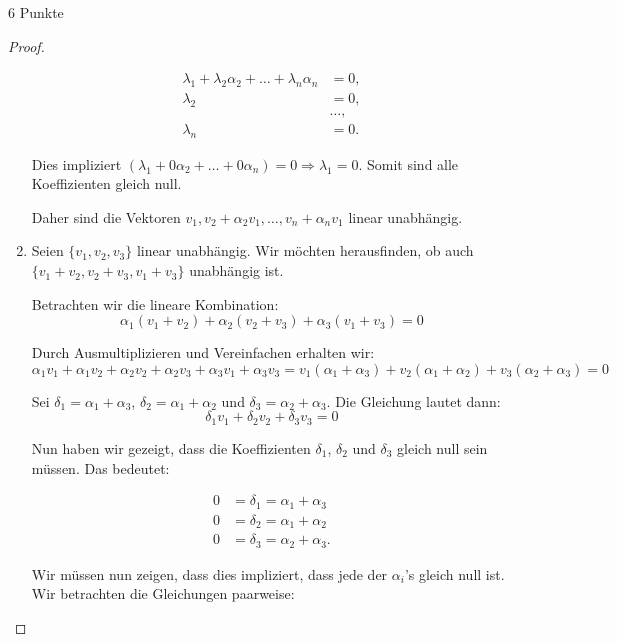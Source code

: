 \documentclass{../problemset}
\begin{document}
\begin{problem}{6 Punkte}
\begin{proof}
\begin{enumerate}
		      \begin{align*}
			      \lambda_1 + \lambda_2\alpha_2 + \ldots + \lambda_n\alpha_n & = 0,    \\
			      \lambda_2                                                  & = 0,    \\
			                                                                 & \ldots, \\
			      \lambda_n                                                  & = 0.
		      \end{align*}

		      Dies impliziert $(\lambda_1 + 0\alpha_2 + \ldots + 0\alpha_n) = 0 \Rightarrow \lambda_1 = 0$.
		      Somit sind alle Koeffizienten gleich null.

		      Daher sind die Vektoren $v_1, v_2 + \alpha_2v_1, \ldots, v_n + \alpha_nv_1$ linear unabhängig.

		\item Seien \(\{v_1, v_2, v_3\}\) linear unabhängig. Wir möchten herausfinden, ob auch \(\{v_1+v_2, v_2+v_3, v_1+v_3\}\) unabhängig ist.

		      Betrachten wir die lineare Kombination:
		      \[
			      \alpha_1(v_1+v_2) + \alpha_2(v_2+v_3) + \alpha_3(v_1+v_3) = 0
		      \]

		      Durch Ausmultiplizieren und Vereinfachen erhalten wir:
		      \[
			      \alpha_1v_1 + \alpha_1v_2 + \alpha_2v_2 + \alpha_2v_3 + \alpha_3v_1 + \alpha_3v_3 = v_1(\alpha_1+\alpha_3) + v_2(\alpha_1+\alpha_2) + v_3(\alpha_2+\alpha_3) = 0
		      \]

		      Sei \(\delta_1 = \alpha_1 + \alpha_3\), \(\delta_2 = \alpha_1 + \alpha_2\) und \(\delta_3 = \alpha_2 + \alpha_3\). Die Gleichung lautet dann:
		      \[
			      \delta_1v_1 + \delta_2v_2 + \delta_3v_3 = 0
		      \]

		      Nun haben wir gezeigt, dass die Koeffizienten \(\delta_1\), \(\delta_2\) und \(\delta_3\) gleich null sein müssen. Das bedeutet:

		      \begin{align*}
			      0 & = \delta_1 = \alpha_1 + \alpha_3  \\
			      0 & = \delta_2 = \alpha_1 + \alpha_2  \\
			      0 & = \delta_3 = \alpha_2 + \alpha_3.
		      \end{align*}

		      Wir müssen nun zeigen, dass dies impliziert, dass jede der \(\alpha_i\)'s gleich null ist. Wir betrachten die Gleichungen paarweise:


\end{enumerate}
\end{proof}
\end{problem}
\end{document}
